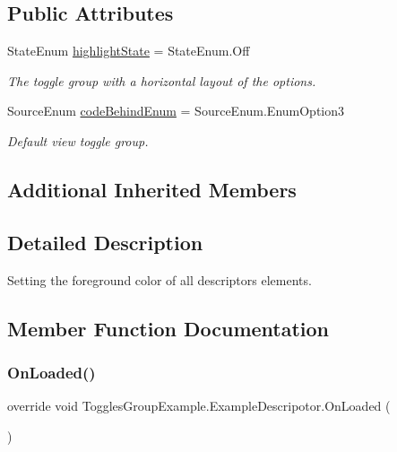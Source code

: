 \subsection*{Public Attributes}
\begin{DoxyCompactItemize}
\item 
State\+Enum \mbox{\hyperlink{class_toggles_group_example_1_1_example_descripotor_a372936210829261828b8a3a2a3071d38}{highlight\+State}} = State\+Enum.\+Off
\begin{DoxyCompactList}\small\item\em The toggle group with a horizontal layout of the options. \end{DoxyCompactList}\item 
Source\+Enum \mbox{\hyperlink{class_toggles_group_example_1_1_example_descripotor_aede3e41c949f898ef6bf040beb34758b}{code\+Behind\+Enum}} = Source\+Enum.\+Enum\+Option3
\begin{DoxyCompactList}\small\item\em Default view toggle group. \end{DoxyCompactList}\end{DoxyCompactItemize}
\subsection*{Additional Inherited Members}


\subsection{Detailed Description}
Setting the foreground color of all descriptor\textquotesingle{}s elements. 



\subsection{Member Function Documentation}
\mbox{\label{class_toggles_group_example_1_1_example_descripotor_a819096dc88f0d032a71835bd14f28eab}} 
\subsubsection{\texorpdfstring{On\+Loaded()}{OnLoaded()}}
{\footnotesize\ttfamily override void Toggles\+Group\+Example.\+Example\+Descripotor.\+On\+Loaded (\begin{DoxyParamCaption}{ }\end{DoxyParamCaption})\hspace{0.3cm}{\ttfamily [virtual]}}



